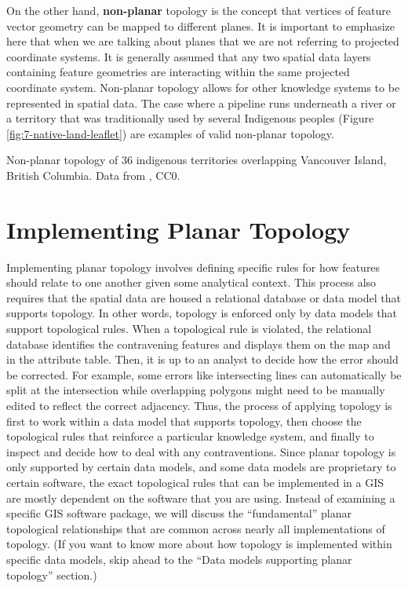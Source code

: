 \documentclass[
]{book}
\begin{document}
On the other hand, \textbf{non-planar} topology is the concept that vertices of feature vector geometry can be mapped to different planes. It is important to emphasize here that when we are talking about planes that we are not referring to projected coordinate systems. It is generally assumed that any two spatial data layers containing feature geometries are interacting within the same projected coordinate system. Non-planar topology allows for other knowledge systems to be represented in spatial data. The case where a pipeline runs underneath a river or a territory that was traditionally used by several Indigenous peoples (Figure \ref{fig:7-native-land-leaflet}) are examples of valid non-planar topology.

\label{fig:7-native-land-leaflet}Non-planar topology of 36 indigenous territories overlapping Vancouver Island, British Columbia. Data from \citet{native_land_native_nodate}, CC0.

\hypertarget{implementing-planar-topology}{%
\section{Implementing Planar Topology}\label{implementing-planar-topology}}

Implementing planar topology involves defining specific rules for how features should relate to one another given some analytical context. This process also requires that the spatial data are housed a relational database or data model that supports topology. In other words, topology is enforced only by data models that support topological rules. When a topological rule is violated, the relational database identifies the contravening features and displays them on the map and in the attribute table. Then, it is up to an analyst to decide how the error should be corrected. For example, some errors like intersecting lines can automatically be split at the intersection while overlapping polygons might need to be manually edited to reflect the correct adjacency. Thus, the process of applying topology is first to work within a data model that supports topology, then choose the topological rules that reinforce a particular knowledge system, and finally to inspect and decide how to deal with any contraventions. Since planar topology is only supported by certain data models, and some data models are proprietary to certain software, the exact topological rules that can be implemented in a GIS are mostly dependent on the software that you are using. Instead of examining a specific GIS software package, we will discuss the ``fundamental'' planar topological relationships that are common across nearly all implementations of topology. (If you want to know more about how topology is implemented within specific data models, skip ahead to the ``Data models supporting planar topology'' section.)
\end{document}
